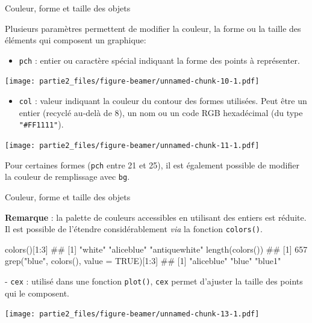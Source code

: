 \documentclass[12pt,ignorenonframetext,]{beamer}
\newenvironment{Shaded}{}{}
\newcommand{\KeywordTok}[1]{\textcolor[rgb]{0.00,0.00,1.00}{#1}}
\newcommand{\DataTypeTok}[1]{#1}
\newcommand{\DecValTok}[1]{#1}
\newcommand{\StringTok}[1]{\textcolor[rgb]{0.00,0.50,0.50}{#1}}
\newcommand{\OtherTok}[1]{\textcolor[rgb]{1.00,0.25,0.00}{#1}}
\newcommand{\OperatorTok}[1]{#1}
\newcommand{\NormalTok}[1]{#1}
\providecommand{\tightlist}{%
  \setlength{\itemsep}{0pt}\setlength{\parskip}{0pt}}
\renewenvironment{Shaded}{\begin{snugshade}}{\end{snugshade}}
\newcommand{\intertitre}[1]{\textcolor{redInsee}{\textbf{#1}}}
\begin{document}
\begin{frame}[fragile]{Couleur, forme et taille des objets}

Plusieurs paramètres permettent de modifier la couleur, la forme ou la
taille des éléments qui composent un graphique:

\begin{itemize}
\tightlist
\item
  \pause \texttt{pch} : entier ou caractère spécial indiquant la forme
  des points à représenter.
\end{itemize}

\texttt{[image: partie2\_files/figure-beamer/unnamed-chunk-10-1.pdf]}

\begin{itemize}
\tightlist
\item
  \pause \texttt{col} : valeur indiquant la couleur du contour des
  formes utilisées. Peut être un entier (recyclé au-delà de 8), un nom
  ou un code RGB hexadécimal (du type \texttt{"\#FF1111"}). \small  
\end{itemize}

\texttt{[image: partie2\_files/figure-beamer/unnamed-chunk-11-1.pdf]}

Pour certaines formes (\texttt{pch} entre 21 et 25), il est également
possible de modifier la couleur de remplissage avec \texttt{bg}.

\end{frame}

\begin{frame}[fragile]{Couleur, forme et taille des objets}

\intertitre{Remarque} : la palette de couleurs accessibles en utilisant
des entiers est réduite. Il est possible de l'étendre considérablement
\emph{via} la fonction \texttt{colors()}.

\small

\begin{Shaded}
\begin{Highlighting}[]
\KeywordTok{colors}\NormalTok{()[}\DecValTok{1}\OperatorTok{:}\DecValTok{3}\NormalTok{]}
\NormalTok{  ## [1] "white"        "aliceblue"    "antiquewhite"}
\KeywordTok{length}\NormalTok{(}\KeywordTok{colors}\NormalTok{())}
\NormalTok{  ## [1] 657}
\KeywordTok{grep}\NormalTok{(}\StringTok{"blue"}\NormalTok{, }\KeywordTok{colors}\NormalTok{(), }\DataTypeTok{value =} \OtherTok{TRUE}\NormalTok{)[}\DecValTok{1}\OperatorTok{:}\DecValTok{3}\NormalTok{]}
\NormalTok{  ## [1] "aliceblue" "blue"      "blue1"}
\end{Highlighting}
\end{Shaded}

\pause \normalsize
- \texttt{cex} : utilisé dans une fonction \texttt{plot()}, \texttt{cex}
permet d'ajuster la taille des points qui le composent.

\texttt{[image: partie2\_files/figure-beamer/unnamed-chunk-13-1.pdf]}

\end{frame}
\end{document}
